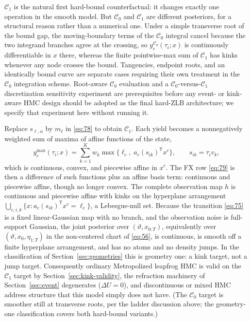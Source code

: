 \documentclass[11pt]{article}
\begin{document}
\(\mathcal C_1\) is the natural first hard-bound counterfactual: it
changes exactly one operation in the smooth model. But \(\mathcal C_0\)
and \(\mathcal C_1\) are different posteriors, for a structural reason
rather than a numerical one. Under a simple
transverse root of the bound gap, the moving-boundary terms of the
\(\mathcal C_0\) integral cancel because the two integrand branches
agree at the crossing, so \(y_c^{\mathcal C_0}(\tau_i;x)\) is
continuously differentiable in \(x\) there, whereas the finite
pointwise-max sum of \(\mathcal C_1\) has kinks whenever any node
crosses the bound. Tangencies, endpoint roots, and an identically bound
curve are separate cases requiring their own treatment in the
\(\mathcal C_0\) integration scheme. Root-aware \(\mathcal C_0\)
evaluation and a \(\mathcal C_0\)-versus-\(\mathcal C_1\)
discretization sensitivity experiment are prerequisites before any
event- or kink-aware HMC design should be adopted as the final
hard-ZLB architecture; we specify that experiment here without
running it.

Replace \(s_{\ell,\alpha}\) by \(m_\ell\) in \eqref{eq:78} to obtain
\(\mathcal C_1\). Each yield becomes a nonnegatively weighted sum of
maxima of affine functions of the state,
\begin{equation}\label{eq:81}
 y_c^{\max}(\tau_i;x)=\sum_{k=1}^{K}w_k
 \max\bigl\{\ell_c,\;a_c(s_{ik})^{\mathsf T}x^c\bigr\},
 \qquad s_{ik}=\tau_i v_k,
\end{equation}
which is continuous, convex, and piecewise affine in \(x^c\). The FX
row \eqref{eq:79} is then a difference of such functions plus an affine
basis term: continuous and piecewise affine, though no longer convex.
The complete observation map \(h\) is continuous and piecewise affine
with kinks on the hyperplane arrangement
\(\bigcup_{c,i,k}\{x:a_c(s_{ik})^{\mathsf T}x^c=\ell_c\}\), a
Lebesgue-null set. Because the transition \eqref{eq:75} is a fixed
linear-Gaussian map with no branch, and the observation noise is
full-support Gaussian, the joint posterior over \((\vartheta,x_{0:T})\),
equivalently over \((\vartheta,x_0,\eta_{1:T})\) in the
non-centered chart of \eqref{eq:56}, is continuous, is smooth off a
finite hyperplane arrangement, and has no atoms and no density jumps.
In the classification of Section~\ref{sec:geometries} this is geometry one: a
kink target, not a jump target. Consequently ordinary Metropolized
leapfrog HMC is valid on the \(\mathcal C_1\) target by
Section~\ref{sec:kink-validity}, the refraction machinery of Section~\ref{sec:event}
degenerates (\(\Delta U=0\)), and discontinuous or mixed HMC address
structure that this model simply does not have. (The \(\mathcal C_0\)
target is smoother still at transverse roots, per the ladder discussion
above; the geometry-one classification covers both hard-bound
variants.)
\end{document}
